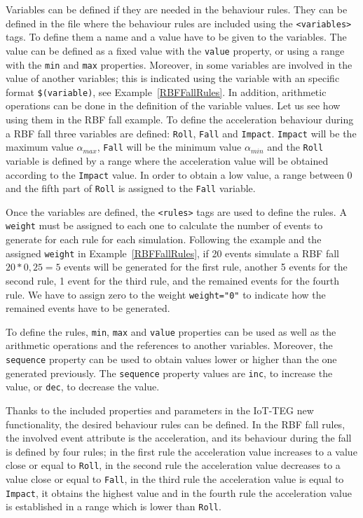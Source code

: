 \documentclass[review]{elsarticle}
\begin{document}
Variables can be defined if they are needed in the behaviour rules. They can be defined in the file where
the behaviour rules are included using the \texttt{<variables>} tags. To define them a name and a value 
have to be given to the variables. The value can be defined as a fixed value with the \texttt{value} 
property, or using a range with the \texttt{min} and \texttt{max} properties. Moreover, in some variables
are involved in the value of another variables; this is indicated using the variable with an specific 
format \texttt{\$(variable)}, see Example~\ref{RBFFallRules}. In addition, arithmetic operations can be 
done in the definition of the variable values. Let us see how using them in the RBF fall example. To 
define the acceleration behaviour during a RBF fall three variables are defined: \texttt{Roll}, 
\texttt{Fall} and \texttt{Impact}. \texttt{Impact} will be the maximum value $\alpha_{max}$, 
\texttt{Fall} will be the minimum value $\alpha_{min}$ and the \texttt{Roll} variable is defined by a 
range where the acceleration value will be obtained according to the \texttt{Impact} value. In order to
obtain a low value, a range between 0 and the fifth part of \texttt{Roll} is assigned to the \texttt{Fall} 
variable.

Once the variables are defined, the \texttt{<rules>} tags are used to define the rules. A \texttt{weight}
must be assigned to each one to calculate the number of events to generate for each rule for each simulation.
Following the example and the assigned \texttt{weight} in Example~\ref{RBFFallRules}, if 20 events simulate 
a RBF fall $20 * 0,25 = 5$ events will be generated for the first rule, another 5 events for the second rule,
1 event for the third rule, and the remained events for the fourth rule. We have to assign zero to the weight
\texttt{weight="0"} to indicate how the remained events have to be generated.

To define the rules, \texttt{min}, \texttt{max} and \texttt{value} properties can be used as well as the arithmetic 
operations and the references to another variables. Moreover, the \texttt{sequence} property can be used to obtain
values lower or higher than the one generated previously. The \texttt{sequence} property values are \texttt{inc}, 
to increase the value, or \texttt{dec}, to decrease the value.

Thanks to the included properties and parameters in the IoT-TEG new functionality, the desired behaviour rules can
be defined. In the RBF fall rules, the involved event attribute is the acceleration, and its behaviour during the 
fall is defined by four rules; in the first rule the acceleration value increases to a value close or equal to \texttt{Roll},
in the second rule the acceleration value decreases to a value close or equal to \texttt{Fall}, in the third rule the 
acceleration value is equal to \texttt{Impact}, it obtains the highest value and in the fourth rule the acceleration value
is established in a range which is lower than \texttt{Roll}.
\end{document}
